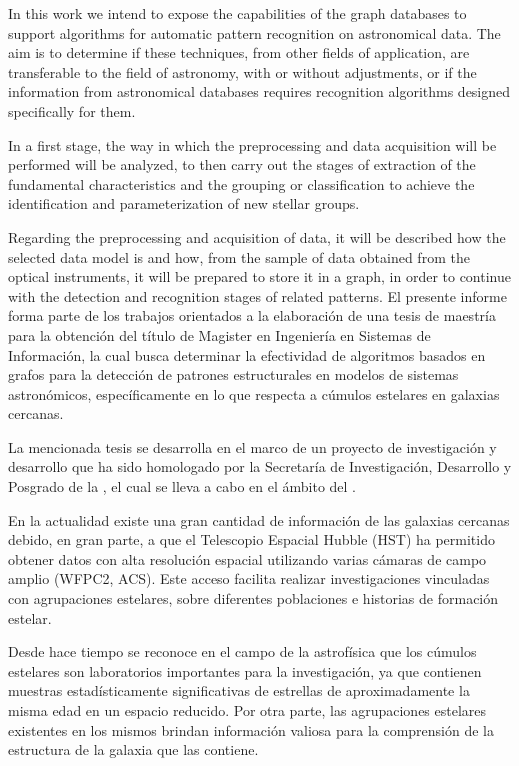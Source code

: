 	In this work we intend to expose the capabilities of the graph databases to support algorithms for automatic pattern recognition on astronomical data. The aim is to determine if these techniques, from other fields of application, are transferable to the field of astronomy, with or without adjustments, or if the information from astronomical databases requires recognition algorithms designed specifically for them.
	
	In a first stage, the way in which the preprocessing and data acquisition will be performed will be analyzed, to then carry out the stages of extraction of the fundamental characteristics and the grouping or classification to achieve the identification and parameterization of new stellar groups.
	
	Regarding the preprocessing and acquisition of data, it will be described how the selected data model is and how, from the sample of data obtained from the optical instruments, it will be prepared to store it in a graph, in order to continue with the detection and recognition stages of related patterns.
\else
	El presente informe forma parte de los trabajos orientados a la elaboración de una tesis de maestría para la obtención del título de Magister en Ingeniería en Sistemas de Información, la cual busca determinar la efectividad de algoritmos basados en grafos para la detección de patrones estructurales en modelos de sistemas astronómicos, específicamente en lo que respecta a cúmulos estelares en galaxias cercanas.
	
	La mencionada tesis se desarrolla en el marco de un proyecto de investigación y desarrollo que ha sido homologado por la Secretaría de Investigación, Desarrollo y Posgrado de la \utn, el cual se lleva a cabo en el ámbito del \cids.
	
	En la actualidad existe una gran cantidad de información de las galaxias cercanas debido, en gran parte, a que el Telescopio Espacial Hubble (HST) ha permitido obtener datos con alta resolución espacial utilizando varias cámaras de campo amplio (WFPC2, ACS)\cite{dalcanton2009acs}. Este acceso facilita realizar investigaciones vinculadas con agrupaciones estelares, sobre diferentes poblaciones e historias de formación estelar.
	
	Desde hace tiempo se reconoce en el campo de la astrofísica que los cúmulos estelares son laboratorios importantes para la investigación, ya que contienen muestras estadísticamente significativas de estrellas de aproximadamente la misma edad en un espacio reducido. Por otra parte, las agrupaciones estelares existentes en los mismos brindan información valiosa para la comprensión de la estructura de la galaxia que las contiene. 
	
